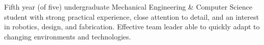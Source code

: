 
\begin{center}
	\begin{minipage}[t]{0.90\textwidth}
		Fifth year (of five) undergraduate Mechanical Engineering \& Computer Science student with strong practical experience, close attention to detail, and an interest in robotics, design, and fabrication. Effective team leader able to quickly adapt to changing environments and technologies.
	\end{minipage}
\end{center}